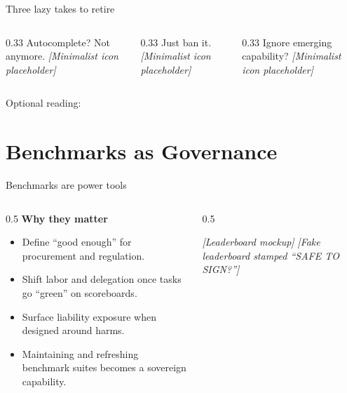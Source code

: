\documentclass[10pt, aspectratio=169]{beamer}
\newcommand{\placeholder}[1]{\textit{[#1]}}
\begin{document}
\begin{frame}{Three lazy takes to retire}
  \begin{columns}[T]
    \begin{column}{0.33\textwidth}
      \centering
      {\Large Autocomplete? Not anymore.}
      \vspace{0.5em}
      \placeholder{Minimalist icon placeholder}
    \end{column}
    \begin{column}{0.33\textwidth}
      \centering
      {\Large Just ban it.}
      \vspace{0.5em}
      \placeholder{Minimalist icon placeholder}
    \end{column}
    \begin{column}{0.33\textwidth}
      \centering
      {\Large Ignore emerging capability?}
      \vspace{0.5em}
      \placeholder{Minimalist icon placeholder}
    \end{column}
  \end{columns}
  \vfill
  \small Optional reading: \parencite{stanford_legal_hallucination,phi3_blog}
\end{frame}

\section{Benchmarks as Governance}

\begin{frame}{Benchmarks are power tools}
  \begin{columns}[T]
    \begin{column}{0.5\textwidth}
      \textbf{Why they matter}
      \begin{itemize}
        \item Define ``good enough'' for procurement and regulation.
        \item Shift labor and delegation once tasks go ``green'' on scoreboards.
        \item Surface liability exposure when designed around harms.
        \item Maintaining and refreshing benchmark suites becomes a sovereign capability.
      \end{itemize}
    \end{column}
    \begin{column}{0.5\textwidth}
      \begin{block}{\placeholder{Leaderboard mockup}}
        \centering
        \placeholder{Fake leaderboard stamped ``SAFE TO SIGN?''}
      \end{block}
    \end{column}
  \end{columns}
  \vfill
  \small \parencite{legalbench_site,lexglue_paper,coliee_site}
\end{frame}
\end{document}
